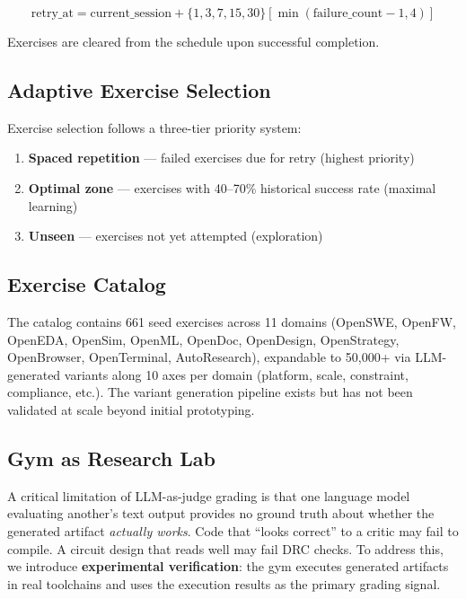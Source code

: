\documentclass[11pt,a4paper]{article}
\begin{document}
\begin{equation}
\text{retry\_at} = \text{current\_session} + \{1, 3, 7, 15, 30\}[\min(\text{failure\_count} - 1, 4)]
\end{equation}

Exercises are cleared from the schedule upon successful completion.

\subsection{Adaptive Exercise Selection}

Exercise selection follows a three-tier priority system:

\begin{enumerate}[noitemsep]
    \item \textbf{Spaced repetition} --- failed exercises due for retry (highest priority)
    \item \textbf{Optimal zone} --- exercises with 40--70\% historical success rate (maximal learning)
    \item \textbf{Unseen} --- exercises not yet attempted (exploration)
\end{enumerate}

\subsection{Exercise Catalog}

The catalog contains 661 seed exercises across 11 domains (OpenSWE, OpenFW, OpenEDA, OpenSim, OpenML, OpenDoc, OpenDesign, OpenStrategy, OpenBrowser, OpenTerminal, AutoResearch), expandable to 50,000+ via LLM-generated variants along 10 axes per domain (platform, scale, constraint, compliance, etc.). The variant generation pipeline exists but has not been validated at scale beyond initial prototyping.

\subsection{Gym as Research Lab}
\label{sec:gym-lab}

A critical limitation of LLM-as-judge grading is that one language model evaluating another's text output provides no ground truth about whether the generated artifact \emph{actually works}. Code that ``looks correct'' to a critic may fail to compile. A circuit design that reads well may fail DRC checks. To address this, we introduce \textbf{experimental verification}: the gym executes generated artifacts in real toolchains and uses the execution results as the primary grading signal.
\end{document}
